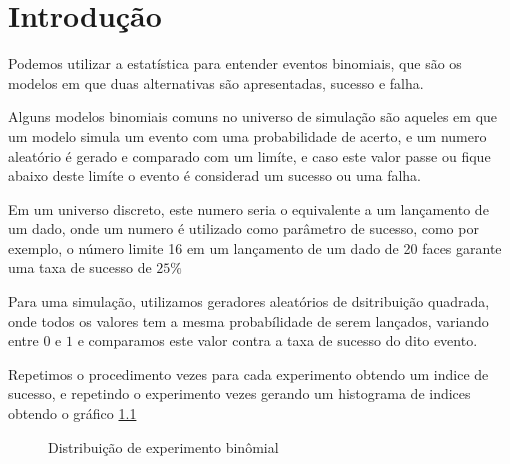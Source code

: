 \chapter{Introdu\c{c}\~{a}o}
Podemos utilizar a estat\'{i}stica para entender eventos binomiais, que s\~{a}o os modelos
em que duas alternativas s\~{a}o apresentadas, sucesso e falha.

Alguns modelos binomiais comuns no universo de simula\c{c}\~{a}o
s\~{a}o aqueles em que um modelo simula um evento com uma probabilidade de acerto,
e um numero aleat\'{o}rio \'{e} gerado e comparado com um lim\'{i}te, e caso este valor passe ou
fique abaixo deste lim\'{i}te o evento \'{e} considerad um sucesso ou uma falha.

Em um universo discreto, este numero seria o equivalente a um lan\c{c}amento de um dado,
onde um numero \'{e} utilizado como par\^{a}metro de sucesso, como por exemplo, o número limite 16
em um lan\c{c}amento de um dado de 20 faces garante uma taxa de sucesso de $25\%$

Para uma simula\c{c}\~{a}o, utilizamos geradores aleat\'{o}rios de dsitribui\c{c}\~{a}o quadrada, onde
todos os valores tem a mesma probabílidade de serem lan\c{c}ados, variando entre $0$ e $1$
e comparamos este valor contra a taxa de sucesso do dito evento.

Repetimos o procedimento \introexperimentsize{} vezes para cada experimento obtendo um indice de sucesso,
e repetindo o experimento \introexperimentrepeats{} vezes gerando um histograma de indices obtendo o gr\'{a}fico
\ref{intro:binomial}

\begin{center}
\begin{figure}[H]
\begin{center}
\label{intro:binomial}
\caption{Distribui\c{c}\~ao de experimento bin\^omial}
\end{center}
\end{figure}
\end{center}

